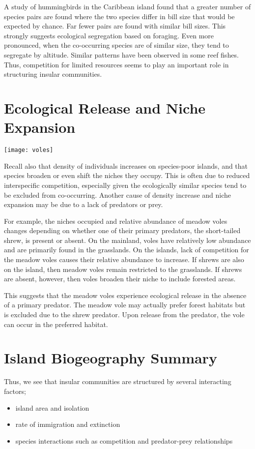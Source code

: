 \documentclass[letterpaper]{tufte-handout}
\begin{document}
A study of hummingbirds in the Caribbean island found that a greater number of species pairs are found where the two species differ in bill size that would be expected by chance.  Far fewer pairs are found with similar bill sizes.  This strongly suggests ecological segregation based on foraging.  Even more pronounced, when the co-occurring species are of similar size, they tend to segregate by altitude.  Similar patterns have been observed in some reef fishes.  Thus, competition for limited resources seems to play an important role in structuring insular communities.

\section{Ecological Release and Niche Expansion}
\begin{marginfigure}
	\texttt{[image: voles]}\\
\end{marginfigure}

Recall also that density of individuals increases on species-poor islands, and that species broaden or even shift the niches they occupy.  This is often due to reduced interspecific competition, especially given the ecologically similar species tend to be excluded from co-occurring.  Another cause of density increase and niche expansion may be due to a lack of predators or prey.

For example, the niches occupied and relative abundance of meadow voles changes depending on whether one of their primary predators, the short-tailed shrew, is present or absent.  On the mainland, voles have relatively low abundance and are primarily found in the grasslands.  On the islands, lack of competition for the meadow voles causes their relative abundance to increase.  If shrews are also on the island, then meadow voles remain restricted to the grasslands.  If shrews are absent, however, then voles broaden their niche to include forested areas.

This suggests that the meadow voles experience ecological release in the absence of a primary predator.  The meadow vole may actually prefer forest habitats but is excluded due to the shrew predator.  Upon release from the predator, the vole can occur in the preferred habitat.  

\section{Island Biogeography Summary}

Thus, we see that insular communities are structured by several interacting factors;
\begin{itemize}
	\item island area and isolation
	\item rate of immigration and extinction
	\item species interactions such as competition and predator-prey relationships
\end{itemize}
\end{document}
